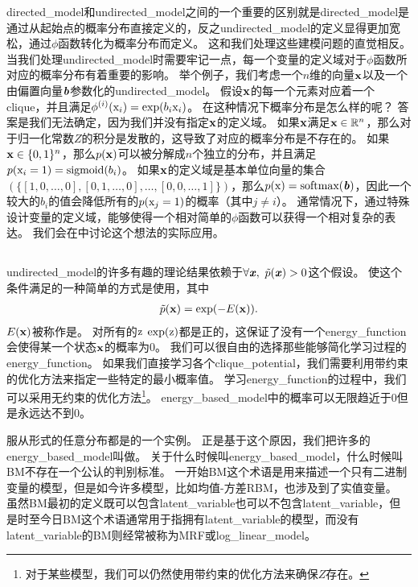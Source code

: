 \gls{directed_model}和\gls{undirected_model}之间的一个重要的区别就是\gls{directed_model}是通过从起始点的概率分布直接定义的，反之\gls{undirected_model}的定义显得更加宽松，通过$\phi$函数转化为概率分布而定义。
这和我们处理这些建模问题的直觉相反。
当我们处理\gls{undirected_model}时需要牢记一点，每一个变量的定义域对于$\phi$函数所对应的概率分布有着重要的影响。
举个例子，我们考虑一个$n$维的向量$\mathbf{x}$以及一个由偏置向量$\boldsymbol{\mathit{b}}$参数化的\gls{undirected_model}。
假设$\mathbf{x}$的每一个元素对应着一个\gls{clique}，并且满足$\phi^{(i)}(\mathrm{x}_i) = \exp(b_i\mathrm{x}_i)$。
在这种情况下概率分布是怎么样的呢？
答案是我们无法确定，因为我们并没有指定$\mathbf{x}$的定义域。
如果$\mathbf{x}$满足$\mathbf{x} \in \mathbb{R}^n$，那么对于归一化常数$Z$的积分是发散的，这导致了对应的概率分布是不存在的。
如果$\mathbf{x}\in\{0,1\}^n$，那么$p(\mathbf{x})$可以被分解成$n$个独立的分布，并且满足$p(\mathrm{x}_i=1) = \text{sigmoid}(b_i)$。
如果$\mathbf{x}$的定义域是基本单位向量的集合$(\{[1,0,\ldots,0],[0,1,\ldots,0],\ldots,[0,0,\ldots,1]\})$，那么$p(\mathrm{x}) = \text{softmax}(\boldsymbol{\mathit{b}})$，因此一个较大的$b_i$的值会降低所有的$p(\mathrm{x}_j = 1)$的概率（其中$j\neq i$）。
通常情况下，通过特殊设计变量的定义域，能够使得一个相对简单的$\phi$函数可以获得一个相对复杂的表达。
我们会在中讨论这个想法的实际应用。


\subsection{}
\label{sec:energy_based_models}


\gls{undirected_model}的许多有趣的理论结果依赖于$\forall \boldsymbol{\mathit{x}},\ \tilde{p}(\boldsymbol{\mathit{x}})>0$这个假设。
使这个条件满足的一种简单的方式是使用，其中
\begin{align}
\label{eqn:167}
\tilde{p}(\mathbf{x}) = \exp(-E(\mathbf{x})).
\end{align}
$E(\mathbf{x})$被称作是。
对所有的$\mathrm{z}$ $\exp(\mathrm{z})$都是正的，这保证了没有一个\gls{energy_function}会使得某一个状态$\mathbf{x}$的概率为$0$。
我们可以很自由的选择那些能够简化学习过程的\gls{energy_function}。
如果我们直接学习各个\gls{clique_potential}，我们需要利用带约束的优化方法来指定一些特定的最小概率值。
学习\gls{energy_function}的过程中，我们可以采用无约束的优化方法\footnote{对于某些模型，我们可以仍然使用带约束的优化方法来确保$Z$存在。}。
\gls{energy_based_model}中的概率可以无限趋近于$0$但是永远达不到$0$。


服从形式的任意分布都是的一个实例。
正是基于这个原因，我们把许多的\gls{energy_based_model}叫做\citep{Fahlman83,Ackley85,Hinton84,Hinton86a}。
关于什么时候叫\gls{energy_based_model}，什么时候叫\gls{BM}不存在一个公认的判别标准。
一开始\gls{BM}这个术语是用来描述一个只有二进制变量的模型，但是如今许多模型，比如均值-方差\gls{RBM}，也涉及到了实值变量。
虽然\gls{BM}最初的定义既可以包含\gls{latent_variable}也可以不包含\gls{latent_variable}，但是时至今日\gls{BM}这个术语通常用于指拥有\gls{latent_variable}的模型，而没有\gls{latent_variable}的\gls{BM}则经常被称为\gls{MRF}或\gls{log_linear_model}。



